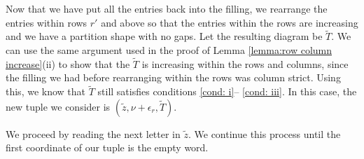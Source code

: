 \begin{alg}
    
Now that we have put all the entries back into the filling, we rearrange the entries within rows $r'$ and above so that the entries within the rows are increasing and we have a partition shape with no gaps.
Let the resulting diagram be $\tilde{T}$. We can use the same argument used in the proof of Lemma \ref{lemma:row column increase}(ii) to show that the $\tilde{T}$ is increasing within the rows and columns, since the filling we had before rearranging within the rows was column strict. Using this, we know that $\tilde{T}$ still satisfies conditions \ref{cond: i}-- \ref{cond: iii}.
In this case, the new tuple we consider is $(\tilde{z},\nu+\epsilon_{r}, \tilde{T})$.

We proceed by reading the next letter in $\tilde{z}$. We continue this process until the first coordinate of our tuple is the empty word.
    \end{alg}

